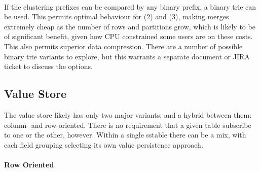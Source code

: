 \documentclass[fleqn]{article}
\begin{document}
\paragraph{}
    If the clustering prefixes can be compared by any binary prefix, a binary trie can be used.
    This permits optimal behaviour for (2) and (3), making merges extremely
    cheap as the number of rows and partitions grow, which is likely to be of significant benefit,
    given how CPU constrained some users are on these costs. This also permits superior
    data compression. There are a number of possible binary trie variants to explore, but this
    warrants a separate document or JIRA ticket to discuss the options.

\subsection{Value Store}
The value store likely has only two major variants, and a hybrid between them: column- and row-oriented.
There is no requirement that a given table subscribe to one or the other, however. Within a single sstable
there can be a mix, with each field grouping selecting its own value persistence approach.
\paragraph{Row Oriented}
\end{document}
